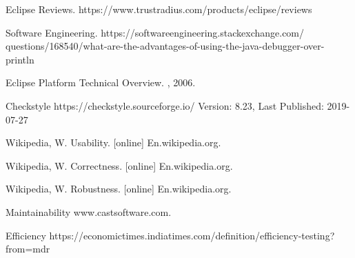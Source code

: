 \documentclass[10pt]{article}
\begin{document}
\begin{thebibliography}{1}
	
\bibitem{}
Eclipse Reviews.
\newblock https://www.trustradius.com/products/eclipse/reviews
	
\bibitem{}
Software Engineering.
\newblock https://softwareengineering.stackexchange.com/
questions/168540/what-are-the-advantages-of-using-the-java-debugger-over-println
	
\bibitem{}
Eclipse Platform Technical Overview.
, 2006.

\bibitem{}
Checkstyle
\newblock https://checkstyle.sourceforge.io/
\newblock Version: 8.23, Last Published: 2019-07-27 

\bibitem{}
\newblock Wikipedia, W. Usability. [online] En.wikipedia.org.

\bibitem{}
\newblock Wikipedia, W. Correctness. [online] En.wikipedia.org.

\bibitem{}
\newblock Wikipedia, W. Robustness. [online] En.wikipedia.org.

\bibitem{}
 Maintainability
\newblock www.castsoftware.com.

\bibitem{}
Efficiency
\newblock https://economictimes.indiatimes.com/definition/efficiency-testing?from=mdr

\end{thebibliography}
\end{document}

